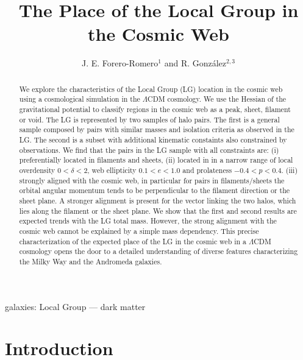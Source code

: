 \documentclass{emulateapj}
\begin{document}
\title{The Place of the Local Group in the Cosmic Web}
\author{J. E. Forero-Romero$^1$ and R. Gonz\'alez$^{2,3}$}


\begin{abstract}
We explore the characteristics of the Local Group (LG)
location in the cosmic web using a cosmological simulation in the
$\Lambda$CDM cosmology.  
We use the Hessian of the gravitational potential to classify regions
in the cosmic web as a peak, sheet, filament or void.  
The LG is represented by two samples of halo
pairs. 
The first is a general sample composed by pairs with
similar masses and isolation criteria as observed in the LG.  
The second is a subset with additional kinematic constaints also
constrained by observations. 
We find that the pairs in the LG sample with all constraints are: (i)
preferentially   located in filaments and sheets, (ii) located in in a
narrow range of local overdensity $0<\delta<2$, web ellipticity $0.1<e<1.0$ and
prolateness $-0.4<p<0.4$.  (iii) strongly aligned with the cosmic web,
in particular for pairs in filaments/sheets the orbital angular
momentum tends to be perpendicular to the filament direction or the
sheet plane. 
A stronger alignment is present for the vector linking the two halos,
which lies along the filament or the sheet plane.  
We show that the first and second results are expected trends with the LG
total mass. 
However, the strong alignment with the cosmic web cannot be explained
by a simple mass dependency. 
This precise characterization of the expected place of the LG in the
cosmic web in a $\Lambda$CDM cosmology opens the door to a detailed
understanding of diverse features characterizing the Milky Way and the
Andromeda galaxies.  

\end{abstract}

\begin{keywords}
{galaxies: Local Group --- dark matter}
\end{keywords}


\section{Introduction}
\label{sec:intro}
\end{document}
